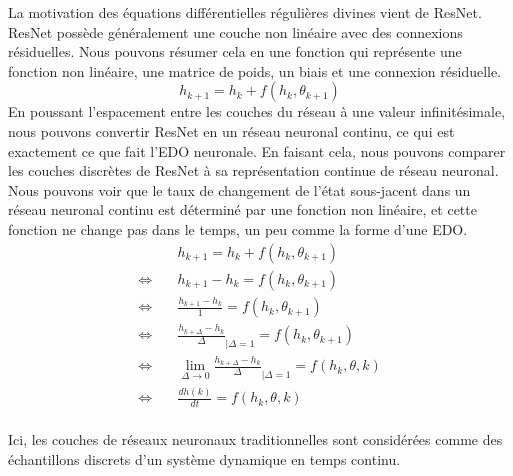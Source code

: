 La motivation des équations différentielles régulières divines vient de ResNet. ResNet possède généralement une couche non linéaire avec des connexions résiduelles. Nous pouvons résumer cela en une fonction qui représente une fonction non linéaire, une matrice de poids, un biais et une connexion résiduelle.
\begin{equation}
    h_{k+1} = h_k + f(h_k, \theta_{k+1})
\end{equation}
En poussant l'espacement entre les couches du réseau à une valeur infinitésimale, nous pouvons convertir ResNet en un réseau neuronal continu, ce qui est exactement ce que fait l'EDO neuronale. En faisant cela, nous pouvons comparer les couches discrètes de ResNet à sa représentation continue de réseau neuronal. Nous pouvons voir que le taux de changement de l'état sous-jacent dans un réseau neuronal continu est déterminé par une fonction non linéaire, et cette fonction ne change pas dans le temps, un peu comme la forme d'une EDO.
\begin{align*}
    &h_{k+1} = h_k + f(h_k, \theta_{k+1}) \\
    \Leftrightarrow \quad &  h_{k+1} - h_k = f(h_k, \theta_{k+1}) \\
    \Leftrightarrow \quad & \frac{h_{k+1} - h_k}{1} = f(h_k, \theta_{k+1}) \\
    \Leftrightarrow \quad & \frac{h_{k+\Delta} - h_k}{\Delta}_{|\Delta=1} = f(h_k, \theta_{k+1}) \\
    \Leftrightarrow \quad & \lim_{\Delta \to 0} \frac{h_{k+\Delta} - h_k}{\Delta}_{|\Delta=1} = f(h_k, \theta, k) \\
    \Leftrightarrow \quad & \frac{dh(k)}{dt} = f(h_k, \theta, k) \\
\end{align*}

Ici, les couches de réseaux neuronaux traditionnelles sont considérées comme des échantillons discrets d'un système dynamique en temps continu.

